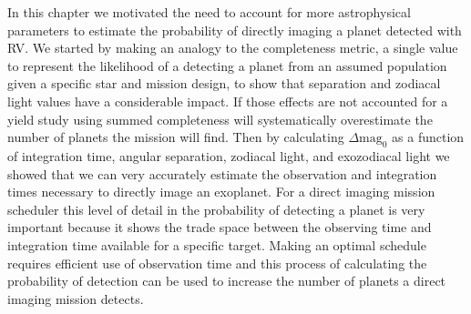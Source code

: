 In this chapter we motivated the need to account for more astrophysical
parameters to estimate the probability of directly imaging a planet detected
with RV. We started by making an analogy to the completeness metric, a single
value to represent the likelihood of a detecting a planet from an assumed
population given a specific star and mission design, to show that separation
and zodiacal light values have a considerable impact. If those effects are not
accounted for a yield study using summed completeness will systematically
overestimate the number of planets the mission will find. Then by calculating
$\Delta\textrm{mag}_0$ as a function of integration time, angular separation,
zodiacal light, and exozodiacal light we showed that we can very accurately
estimate the observation and integration times necessary to directly image an
exoplanet. For a direct imaging mission scheduler this level of detail in the
probability of detecting a planet is very important because it shows the trade
space between the observing time and integration time available for a specific
target. Making an optimal schedule requires efficient use of observation time
and this process of calculating the probability of detection can be used to
increase the number of planets a direct imaging mission detects.

